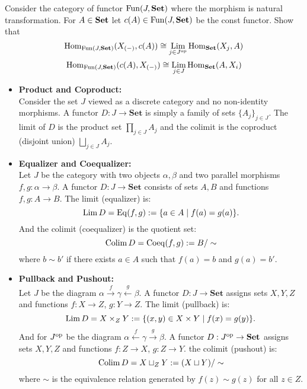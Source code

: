 \begin{exercise}
  Consider the category of functor $ \mathrm{Fun}(J,\mathbf{Set})$ where the morphism is natural transformation. For $A\in \mathbf{Set}$ let $c(A) \in \mathrm{Fun}(J,\mathbf{Set})$ be the const functor. Show that 
\[
  \mathrm{Hom}_{\mathrm{Fun}(J,\mathbf{Set})}(X_{(-)},c(A)) \cong \operatorname*{\mathrm{Lim}}_{j\in J^{\mathrm{op}}} \mathrm{Hom}_{\mathbf{Set}}(X_j , A) 
\]
\[
  \mathrm{Hom}_{\mathrm{Fun}(J,\mathbf{Set})}(c(A),X_{(-)}) \cong \operatorname*{\mathrm{Lim}}_{j\in J} \mathrm{Hom}_{\mathbf{Set}}(A, X_i ) 
\]
\end{exercise}
\begin{example}
  \begin{itemize}
    \item \textbf{Product and Coproduct:} \\
      Consider the set $J$ viewed as a discrete category  and no non-identity morphisms. A functor $D : J \to \mathbf{Set}$ is simply a family of sets $\{A_j\}_{j\in J}$. The limit of $D$ is the product set $\prod_{j\in J} A_j$ and the colimit is the coproduct (disjoint union) $\bigsqcup_{j\in J} A_j$.

    \item \textbf{Equalizer and Coequalizer:} \\
    Let $J$ be the category with two objects $\alpha,\beta$ and two parallel morphisms $f, g : \alpha \to \beta$. A functor $D : J \to \mathbf{Set}$ consists of sets $A, B$ and functions $f, g : A \to B$. The limit (equalizer) is:
    \[
      \operatorname*{\mathrm{Lim}} D = \mathrm{Eq}(f,g):= \{ a \in A \mid f(a) = g(a) \}.
    \]
    And the colimit (coequalizer) is the quotient set:
    \[
    \operatorname*{\mathrm{Colim}} D = \mathrm{Coeq}(f,g):=B / \sim
    \]
    where $b \sim b'$ if there exists $a \in A$ such that $f(a) = b$ and $g(a) = b'$.
    \item \textbf{Pullback and Pushout: } \\
    Let $J$ be the diagram $\alpha \xrightarrow{f} \gamma \xleftarrow{g} \beta$. A functor $D : J \to \mathbf{Set}$ assigns sets $X, Y, Z$ and functions $f : X \to Z$, $g : Y \to Z$. The limit (pullback) is:
    \[
    \operatorname*{\mathrm{Lim}} D = X \times_Z Y := \{ (x, y) \in X \times Y \mid f(x) = g(y) \}.
    \]
  And for $J^{\mathrm{op}}$ be the diagram $\alpha \xleftarrow{f} \gamma \xrightarrow{g} \beta$. A functor $D : J^{\mathrm{op}} \to \mathbf{Set}$ assigns sets $X, Y, Z$ and functions $f :  Z\to X$, $g : Z \to Y$. the colimit (pushout) is: 
  \[
    \operatorname*{\mathrm{Colim}} D = X \sqcup_Z Y := (X \sqcup Y) / \sim
    \]
    where $\sim$ is the equivalence relation generated by $f(z) \sim g(z)$ for all $z \in Z$.

   \end{itemize}
\end{example}
